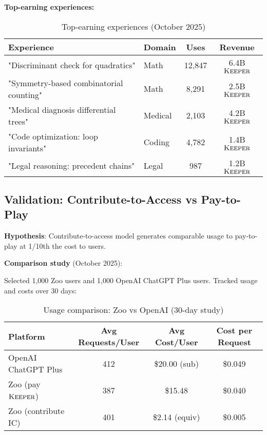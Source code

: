 \documentclass[11pt,letterpaper]{article}
\theoremstyle{definition}
\theoremstyle{remark}
\newcommand{\KEEPER}{\textsc{Keeper}}
\begin{document}
\textbf{Top-earning experiences:}

\begin{table}[h]
\centering
\small
\begin{tabular}{llcc}
\toprule
\textbf{Experience} & \textbf{Domain} & \textbf{Uses} & \textbf{Revenue} \\
\midrule
"Discriminant check for quadratics" & Math & 12,847 & 6.4B $\KEEPER$ \\
"Symmetry-based combinatorial counting" & Math & 8,291 & 2.5B $\KEEPER$ \\
"Medical diagnosis differential trees" & Medical & 2,103 & 4.2B $\KEEPER$ \\
"Code optimization: loop invariants" & Coding & 4,782 & 1.4B $\KEEPER$ \\
"Legal reasoning: precedent chains" & Legal & 987 & 1.2B $\KEEPER$ \\
\bottomrule
\end{tabular}
\caption{Top-earning experiences (October 2025)}
\label{tab:top_experiences}
\end{table}

\subsection{Validation: Contribute-to-Access vs Pay-to-Play}

\textbf{Hypothesis}: Contribute-to-access model generates comparable usage to pay-to-play at 1/10th the cost to users.

\textbf{Comparison study} (October 2025):

Selected 1,000 Zoo users and 1,000 OpenAI ChatGPT Plus users. Tracked usage and costs over 30 days:

\begin{table}[h]
\centering
\begin{tabular}{lccc}
\toprule
\textbf{Platform} & \textbf{Avg Requests/User} & \textbf{Avg Cost/User} & \textbf{Cost per Request} \\
\midrule
OpenAI ChatGPT Plus & 412 & \$20.00 (sub) & \$0.049 \\
Zoo (pay $\KEEPER$) & 387 & \$15.48 & \$0.040 \\
Zoo (contribute IC) & 401 & \$2.14 (equiv) & \$0.005 \\
\bottomrule
\end{tabular}
\caption{Usage comparison: Zoo vs OpenAI (30-day study)}
\label{tab:usage_comparison}
\end{table}
\end{document}
